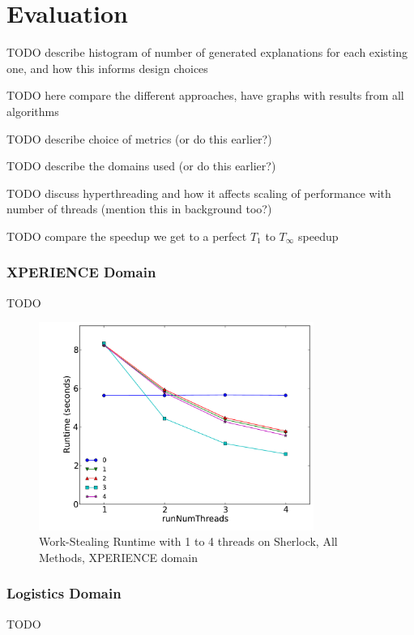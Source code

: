 \chapter{Evaluation}

TODO describe histogram of number of generated explanations for each existing one, and how this informs design choices

TODO here compare the different approaches, have graphs with results from all algorithms

TODO describe choice of metrics (or do this earlier?)

TODO describe the domains used (or do this earlier?)

TODO discuss hyperthreading and how it affects scaling of performance with number of threads (mention this in background too?)

TODO compare the speedup we get to a perfect $T_1$ to $T_\infty$ speedup

\subsection{XPERIENCE Domain}
TODO

\begin{figure}[!htbp]
\begin{centering}
\includegraphics[width=0.8\textwidth]{images/threads-xper5-sherlock-all-1}
\par\end{centering}
\caption{Work-Stealing Runtime with 1 to 4 threads on Sherlock, All Methods, XPERIENCE domain}
\end{figure}

\subsection{Logistics Domain}
TODO

